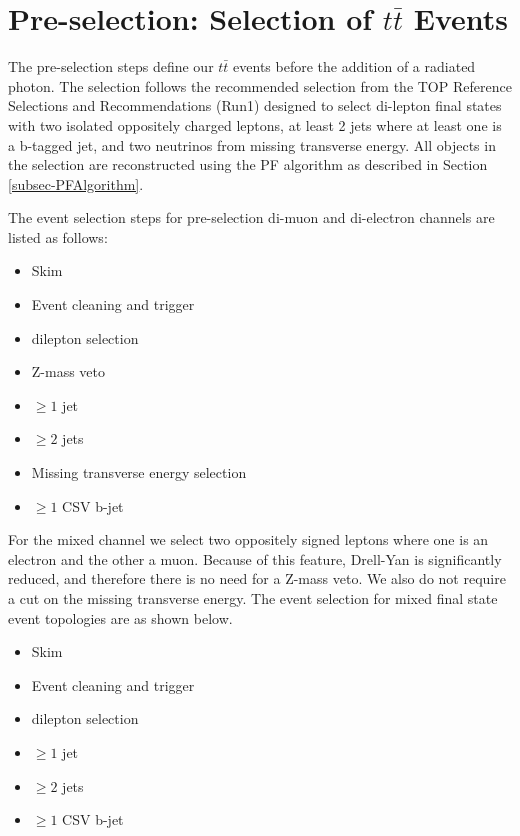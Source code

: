 \section{Pre-selection: Selection of $t\bar{t}$ Events} \label{sec-preselection}

The pre-selection steps define our $t\bar{t}$ events before the addition of a radiated photon. The selection follows the recommended selection from the TOP Reference Selections and Recommendations (Run1) \cite{TopEventSelection} designed to select di-lepton final states with two isolated oppositely charged leptons, at least 2 jets where at least one is a b-tagged jet, and two neutrinos from missing transverse energy. All objects in the selection are reconstructed using the PF algorithm as described in Section \ref{subsec-PFAlgorithm}.  

The event selection steps for pre-selection di-muon and di-electron channels are listed as follows:  

\begin{itemize}
	\item Skim
	\item Event cleaning and trigger
	\item dilepton selection
	\item Z-mass veto
	\item $\geq 1$ jet
	\item $\geq 2$ jets
	\item Missing transverse energy selection
	\item $\geq 1$ CSV b-jet 
\end{itemize}

For the mixed channel we select two oppositely signed leptons where one is an electron and the other a muon. Because of this feature, Drell-Yan is significantly reduced, and therefore there is no need for a Z-mass veto. We also do not require a cut on the missing transverse energy. The event selection for mixed final state event topologies are as shown below.

\begin{itemize}
	\item Skim
	\item Event cleaning and trigger
	\item dilepton selection
	\item $\geq 1$ jet
	\item $\geq 2$ jets
	\item $\geq 1$ CSV b-jet 
\end{itemize}  

